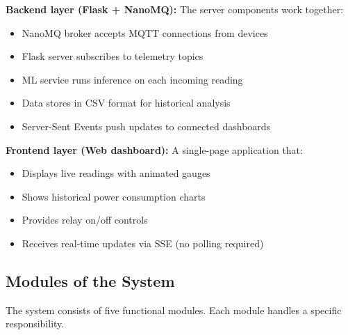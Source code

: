 \documentclass[12pt, a4paper]{article}
\begin{document}
	\textbf{Backend layer (Flask + NanoMQ):} The server components work together:
	
	\begin{itemize}[itemsep=2pt, topsep=4pt]
		\item NanoMQ broker accepts MQTT connections from devices
		\item Flask server subscribes to telemetry topics
		\item ML service runs inference on each incoming reading
		\item Data stores in CSV format for historical analysis
		\item Server-Sent Events push updates to connected dashboards
	\end{itemize}
	
	\textbf{Frontend layer (Web dashboard):} A single-page application that:
	
	\begin{itemize}[itemsep=2pt, topsep=4pt]
		\item Displays live readings with animated gauges
		\item Shows historical power consumption charts
		\item Provides relay on/off controls
		\item Receives real-time updates via SSE (no polling required)
	\end{itemize}
	
	\subsection{Modules of the System}
	
	The system consists of five functional modules. Each module handles a specific responsibility.
	
\end{document}

